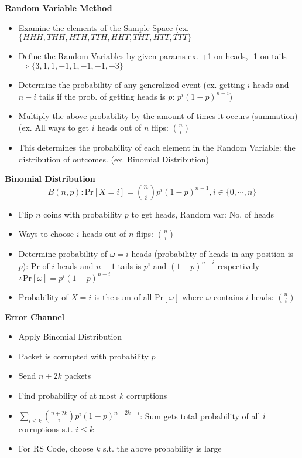 \documentclass{article}\usepackage{amsmath,amssymb,amsthm,tikz,tkz-graph,color,chngpage,soul,hyperref,csquotes,graphicx,floatrow, listings}\newcommand*{\QEDB}{\hfill\ensuremath{\square}}\newtheorem*{prop}{Proposition}\renewcommand{\theenumi}{\alph{enumi}}\usepackage[shortlabels]{enumitem}\usepackage[nobreak=true]{mdframed}\usetikzlibrary{matrix,calc}\MakeOuterQuote{"}\usepackage[margin=0.75in]{geometry} \newtheorem{theorem}{Theorem}\newcommand{\Z}{\mathbb Z}\newcommand{\R}{\mathbb R}\newcommand{\Q}{\mathbb Q}\newcommand{\N}{\mathbb N}\newcommand{\x}[1]{\textrm{ #1 }}\newcommand{\pr}{\textrm{Pr}}
\newcommand{\sumlim}[3]{\sum\limits_{#1}^{#2}#3}
\newcommand{\eq}[1]{\begin{equation}#1\end{equation}}
\begin{document}
\begin{mdframed}
\textbf{Random Variable Method}
\begin{itemize}
    \item Examine the elements of the Sample Space (ex. $\{HHH,THH,HTH,TTH,HHT,THT,HTT,TTT\}$
    \item Define the Random Variables by given params ex. +1 on heads, -1 on tails $\Rightarrow \{3,1,1,-1,1,-1,-1,-3\}$
    \item Determine the probability of any generalized event (ex. getting $i$ heads and $n-i$ tails if the prob. of getting heads is $p$: $p^i(1-p)^{n-i}$)
    \item Multiply the above probability by the amount of times it occurs (summation) (ex. All ways to get $i$ heads out of $n$ flips: $\binom{n}{i}$
    \item This determines the probability of each element in the Random Variable: the distribution of outcomes. (ex. Binomial Distribution)
\end{itemize}
\end{mdframed}
\begin{mdframed}
\textbf{Binomial Distribution}
\eq{B(n,p): \pr[X=i]=\binom{n}{i}p^i(1-p)^{n-1}, i\in\{0,\cdots,n\}}
\begin{itemize}
    \item Flip $n$ coins with probability $p$ to get heads, Random var: No. of heads
    \item Ways to choose $i$ heads out of $n$ flips: $\binom{n}{i}$
    \item Determine probability of $\omega=i$ heads (probability of heads in any position is $p$): $\pr$ of $i$ heads and $n-1$ tails is $p^i$ and $(1-p)^{n-i}$ respectively $\therefore \pr[\omega]=p^i(1-p)^{n-i}$
    \item Probability of $X=i$ is the sum of all $\pr[\omega]$ where $\omega$ contains $i$ heads: $\binom{n}{i}$
\end{itemize}
\end{mdframed}
\textbf{Error Channel}
\begin{itemize}
    \item Apply Binomial Distribution
    \item Packet is corrupted with probability $p$
    \item Send $n+2k$ packets
    \item Find probability of at most $k$ corruptions
    \item $\sumlim{i \le k}{}{\binom{n+2k}{i}p^i(1-p)^{n+2k-i}}$: Sum gets total probability of all $i$ corruptions s.t. $i\le k$
    \item For RS Code, choose $k$ s.t. the above probability is large
\end{itemize}
\end{document}
